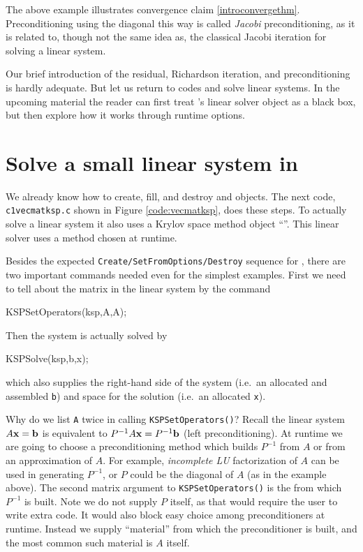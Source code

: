\medskip
The above example illustrates convergence claim \eqref{introconvergethm}.  Preconditioning using the diagonal this way is called \emph{Jacobi} preconditioning, as it is related to, though not the same idea as, the classical Jacobi iteration for solving a linear system.

Our brief introduction of the residual, Richardson iteration, and preconditioning is hardly adequate.  But let us return to \PETSc codes and solve linear systems.  In the upcoming material the reader can first treat \PETSc's linear solver object as a black box, but then explore how it works through runtime options.

\section{Solve a small linear system in \PETSc}

We already know how to create, fill, and destroy \pVec and \pMat objects.  The next code, \texttt{c1vecmatksp.c} shown in Figure \ref{code:vecmatksp}, does these steps.  To actually solve a linear system it also uses a Krylov space method object ``\pKSP''.  This linear solver uses a method chosen at runtime.

Besides the expected \texttt{Create/SetFromOptions/Destroy} sequence for \pKSP, there are two important commands needed even for the simplest examples.  First we need to tell \pKSP about the matrix in the linear system by the command
\begin{code}
KSPSetOperators(ksp,A,A);
\end{code}
Then the system is actually solved by
\begin{code}
KSPSolve(ksp,b,x);
\end{code}
which also supplies the right-hand side of the system (i.e.~an allocated and assembled \pVec \texttt{b}) and space for the solution (i.e.~an allocated \pVec \texttt{x}).

Why do we list \texttt{A} twice in calling \texttt{KSPSetOperators()}?  Recall the linear system $A\mathbf{x}=\mathbf{b}$ is equivalent to $P^{-1} A \mathbf{x} = P^{-1} \mathbf{b}$ (left preconditioning).  At runtime we are going to choose a preconditioning method which builds $P^{-1}$ from $A$ or from an approximation of $A$.  For example, \emph{incomplete LU} factorization of $A$ can be used in generating $P^{-1}$, or $P$ could be the diagonal of $A$ (as in the example above).  The second matrix argument to \texttt{KSPSetOperators()} is the \pMat from which $P^{-1}$ is built.  Note we do not supply $P$ itself, as that would require the user to write extra code.  It would also block easy choice among preconditioners at runtime.  Instead we supply ``material'' from which the preconditioner is built, and the most common such material is $A$ itself.

